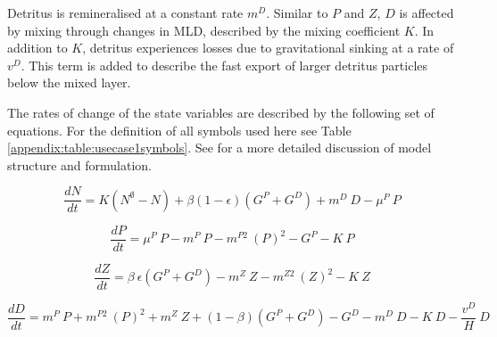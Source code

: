 \documentclass[journal abbreviation, manuscript]{copernicus}
\begin{document}
Detritus is remineralised at a constant rate $m^D$. Similar to $P$ and $Z$, $D$ is affected by mixing through changes in MLD, described by the mixing coefficient $K$. In addition to $K$, detritus experiences losses due to gravitational sinking at a rate of $v^D$. This term is added to describe the fast export of larger detritus particles below the mixed layer. 

The rates of change of the state variables are described by the following set of equations. For the definition of all symbols used here see Table \ref{appendix:table:usecase1symbols}. See \citet{Anderson2015c} for a more detailed discussion of model structure and formulation.

\begin{equation}
    \frac{d N}{d t} = 
    K (N^\emptyset - N) %
    + \beta(1 - \epsilon)(G^P + G^D) %
    + m^D \ D %
    - \mu^{P} \ P %
\end{equation}

\begin{equation}
    \frac{d P}{d t} =
    \mu^{P} \ P  %
    - m^P \ P %
    - m^{P2} \ (P)^2 %
    - G^P %
    - K \ P %
\end{equation}

\begin{equation}
    \frac{d Z}{d t} =
    \beta \ \epsilon(G^P + G^D) %
    - m^Z \ Z %
    - m^{Z2} \ (Z)^2 %
    - K \ Z %
\end{equation}

\begin{equation}
    \frac{d D}{d t} = 
    m^P \ P %
    + m^{P2} \ (P)^2 %
    + m^Z \ Z %
    + (1 - \beta)(G^P + G^D) %
    - G^D %
    - m^D \ D %
    - K \ D %
    - \frac{v^D}{H} \ D %
\end{equation}
\end{document}
